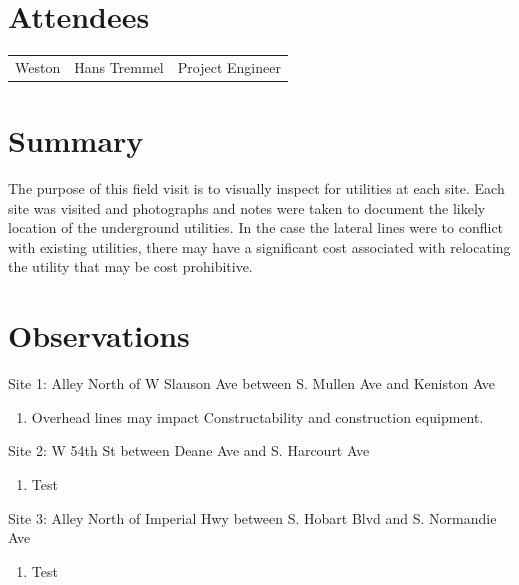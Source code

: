 \documentclass{article}
\newenvironment{pres}[2]{%
  \large{#2}
  \smallskip
}
{
  \goodbreak
  \smallskip
}
\begin{document}
\section*{Attendees}
\begin{table}[h]
  \label{tab:label}
  \begin{tabular}{l l l}
    Weston & Hans Tremmel & Project Engineer \\
  \end{tabular}
\end{table}

\section*{Summary}
The purpose of this field visit is to visually inspect for utilities at each site.  Each site was visited and photographs and notes were taken to document the likely location of the underground utilities.  In the case the lateral lines were to conflict with existing utilities, there may have a significant cost associated with relocating the utility that may be cost prohibitive.

\section*{Observations}
\begin{pres}{}{Site 1: Alley North of W Slauson Ave between S. Mullen Ave and Keniston Ave}
  \begin{enumerate}[noitemsep]
      \item Overhead lines may impact Constructability and construction equipment.
  \end{enumerate}

\end{pres}

\begin{pres}{}{Site 2: W 54th St between Deane Ave and S. Harcourt Ave}
  \begin{enumerate}[noitemsep]
      \item Test
  \end{enumerate}

\end{pres}

\begin{pres}{}{Site 3: Alley North of Imperial Hwy between S. Hobart Blvd and S. Normandie Ave}
  \begin{enumerate}[noitemsep]
      \item Test
  \end{enumerate}
\end{pres}
\end{document}

